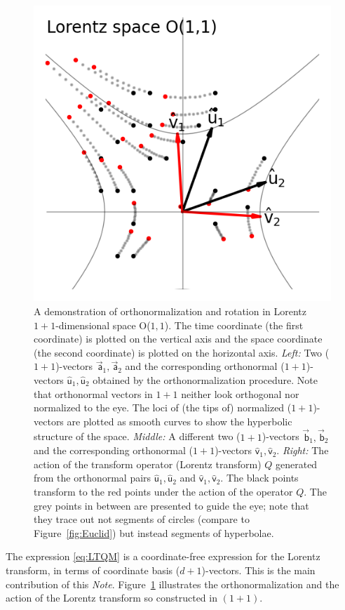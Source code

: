 \documentclass{article}
\newcommand\upvec[1]{\!\vec{\,\mathrm{#1}}}
\newcommand{\Lvec}[1]{\upvec{\mathsf{#1}}} %
\newcommand{\Lhat}[1]{\hat{\mathsf{#1}}} %
\newcommand{\plus}{\!+\!} %
\newcommand{\documentname}{\textsl{Note}}
\newcommand{\figref}[1]{Figure~\ref{#1}}
\newlength{\figurewidth}
\begin{document}
\begin{figure}[t]
\begin{mdframed}
\includegraphics[width=\figurewidth]{L_Q.png}
\caption{A demonstration of orthonormalization and rotation in Lorentz $1\plus1$-dimensional space O($1,1$).
The time coordinate (the first coordinate) is plotted on the vertical axis and the space coordinate (the second coordinate) is plotted on the horizontal axis.
\textsl{Left:} Two ($1\plus1$)-vectors $\Lvec{a}_1, \Lvec{a}_2$ and the corresponding orthonormal ($1\plus1$)-vectors $\Lhat{u}_1, \Lhat{u}_2$ obtained by the orthonormalization procedure.
Note that orthonormal vectors in $1\plus1$ neither look orthogonal nor normalized to the eye.
The loci of (the tips of) normalized ($1\plus1$)-vectors are plotted as smooth curves to show the hyperbolic structure of the space.
\textsl{Middle:} A different two ($1\plus1$)-vectors $\Lvec{b}_1, \Lvec{b}_2$ and the corresponding orthonormal ($1\plus1$)-vectors $\Lhat{v}_1, \Lhat{v}_2$.
\textsl{Right:} The action of the transform operator (Lorentz transform) $Q$ generated from the orthonormal pairs $\Lhat{u}_1, \Lhat{u}_2$ and $\Lhat{v}_1, \Lhat{v}_2$.
The black points transform to the red points under the action of the operator $Q$.
The grey points in between are presented to guide the eye; 
note that they trace out not segments of circles (compare to \figref{fig:Euclid}) but instead segments of hyperbolae.\label{fig:Lorentz}}
\end{mdframed}
\end{figure}
The expression \eqref{eq:LTQM} is a coordinate-free expression for the Lorentz transform, in terms of coordinate basis ($d\plus1$)-vectors.
This is the main contribution of this \documentname.
\figref{fig:Lorentz} illustrates the orthonormalization and the action of the Lorentz transform so constructed in $(1\plus1)$.
\end{document}
